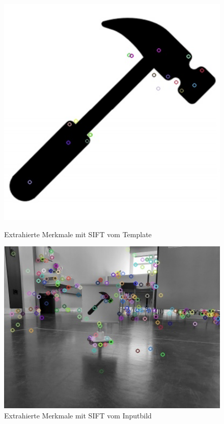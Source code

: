 \begin{figure}[H]
  \centering
  \begin{minipage}[t]{0.45\linewidth}
  \includegraphics[width=1.0\textwidth]{img/piktogrammerkennung/sift_kp1.jpg}
  \caption{Extrahierte Merkmale mit SIFT vom Template}
  \label{fig:sift-kp1}
  \end{minipage} 
  \hfill
  \begin{minipage}[t]{0.45\linewidth}
  \includegraphics[width=1.0\textwidth]{img/piktogrammerkennung/sift_kp2.jpg}
  \caption{Extrahierte Merkmale mit SIFT vom Inputbild}
  \label{fig:sift-kp2}
  \end{minipage}
\end{figure}

